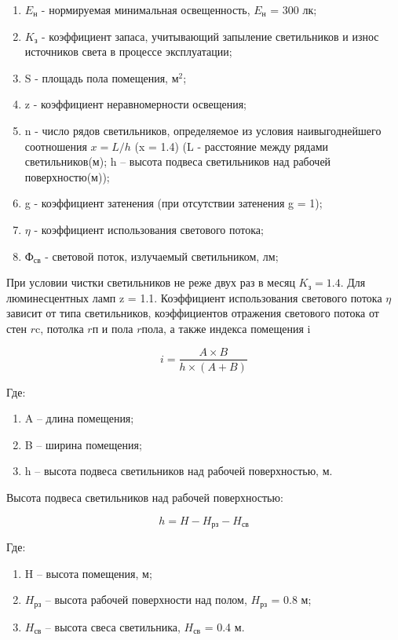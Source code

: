 \begin{enumerate}
    \item $E_{\text{н}}$ - нормируемая минимальная освещенность, $E_{\text{н}}$ = 300 лк;
    \item $K_{\text{з}}$ - коэффициент запаса, учитывающий запыление светильников и износ источников света в процессе эксплуатации;
    \item S - площадь пола помещения, ${\text{м}}^2$; 
    \item z - коэффициент неравномерности освещения;
    \item n - число рядов светильников, определяемое из условия наивыгоднейшего соотношения $x = L \slash h$ (x = 1.4)
         (L - расстояние между рядами светильников(м); h -- высота подвеса светильников над рабочей поверхностю(м));
    \item g - коэффициент затенения (при отсутствии затенения g = 1); 
    \item $\eta$ - коэффициент использования светового потока; 
    \item ${\text{Ф}}_{\text{св}}$ - световой поток, излучаемый светильником, лм; 
\end{enumerate}

При условии чистки светильников не реже двух раз в месяц $K_{\text{з}} = 1.4$. 
Для люминесцентных ламп z = 1.1. Коэффициент использования светового потока $\eta$ зависит от типа светильников,
коэффициентов отражения светового потока от стен $r{\text{c}}$, потолка $r{\text{п}}$ и пола $r{\text{пола}}$,
а также индекса помещения i

\[
    i = \dfrac{A \times B}{h \times (A + B)}
\]

Где:

\begin{enumerate}
    \item A -- длина помещения;
    \item B -- ширина помещения;
    \item h -- высота подвеса светильников над рабочей поверхностью, м.
\end{enumerate}

Высота подвеса светильников над рабочей поверхностью:

\[
    h = H - H_{\text{рз}} - H_{\text{св}}
\]

Где:

\begin{enumerate}
    \item H -- высота помещения, м;
    \item $H_{\text{рз}}$ -- высота рабочей поверхности над полом, $H_{\text{рз}}$ = 0.8 м;
    \item $H_{\text{св}}$ -- высота свеса светильника, $H_{\text{св}}$ = 0.4 м.
\end{enumerate}

